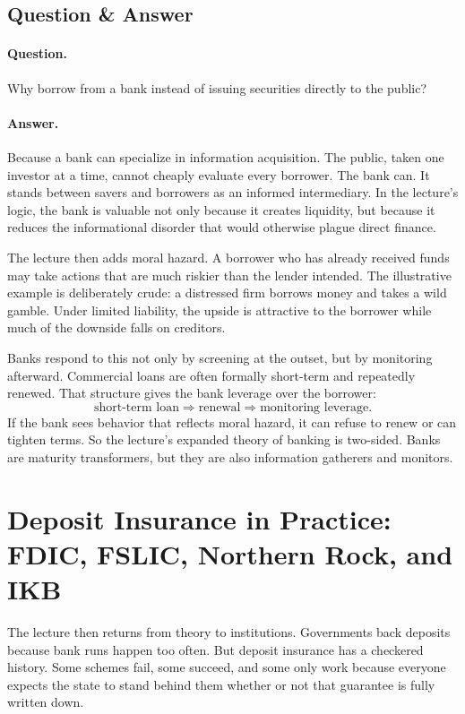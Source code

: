 \subsection{Question \& Answer}

\paragraph{Question.} Why borrow from a bank instead of issuing securities directly to the public?

\paragraph{Answer.} Because a bank can specialize in information acquisition. The public, taken one investor at a time, cannot cheaply evaluate every borrower. The bank can. It stands between savers and borrowers as an informed intermediary. In the lecture's logic, the bank is valuable not only because it creates liquidity, but because it reduces the informational disorder that would otherwise plague direct finance.

The lecture then adds moral hazard. A borrower who has already received funds may take actions that are much riskier than the lender intended. The illustrative example is deliberately crude: a distressed firm borrows money and takes a wild gamble. Under limited liability, the upside is attractive to the borrower while much of the downside falls on creditors.

Banks respond to this not only by screening at the outset, but by monitoring afterward. Commercial loans are often formally short-term and repeatedly renewed. That structure gives the bank leverage over the borrower:
\begin{equation}
\text{short-term loan}
\Rightarrow
\text{renewal}
\Rightarrow
\text{monitoring leverage}.
\end{equation}
If the bank sees behavior that reflects moral hazard, it can refuse to renew or can tighten terms. So the lecture's expanded theory of banking is two-sided. Banks are maturity transformers, but they are also information gatherers and monitors.

\section{Deposit Insurance in Practice: FDIC, FSLIC, Northern Rock, and IKB}

The lecture then returns from theory to institutions. Governments back deposits because bank runs happen too often. But deposit insurance has a checkered history. Some schemes fail, some succeed, and some only work because everyone expects the state to stand behind them whether or not that guarantee is fully written down.

